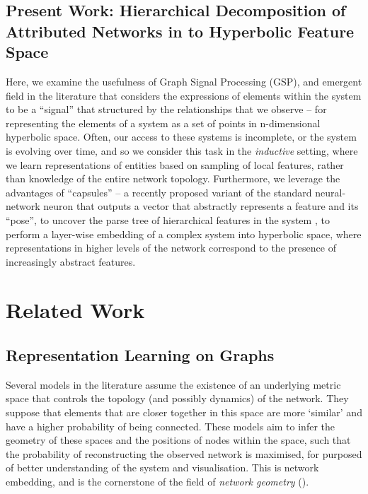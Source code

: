 \documentclass{IEEEtran}
\begin{document}
	
	\subsection{Present Work: Hierarchical Decomposition of Attributed Networks in to Hyperbolic Feature Space}
	Here, we examine the usefulness of Graph Signal Processing (GSP), and emergent field in the literature that considers the expressions of elements within the system to be a ``signal'' that structured by the relationships that we observe \cite{defferrard2016convolutional,kipf2016semi,hamilton2017inductive} -- for representing the elements of a system as a set of points in n-dimensional hyperbolic space.
	Often, our access to these systems is incomplete, or the system is evolving over time, and so we consider this task in the \textit{inductive} setting, where we learn representations of entities based on sampling of local features, rather than knowledge of the entire network topology.
	Furthermore, we leverage the advantages of ``capsules'' -- a recently proposed variant of the standard neural-network neuron that outputs a vector that abstractly represents a feature and its ``pose'', to uncover the parse tree of hierarchical features in the system \cite{hinton2011transforming,sabour2017dynamic}, to perform a layer-wise embedding of a complex system into hyperbolic space, where representations in higher levels of the network correspond to the presence of increasingly abstract features.
	

	
	
	
	\section{Related Work}
	
		
	\subsection{Representation Learning on Graphs}
	Several models in the literature assume the existence of an underlying metric space that controls the topology (and possibly dynamics) of the network. 
	They suppose that elements that are closer together in this space are more `similar' and have a higher probability of being connected. These models aim to infer the geometry of these spaces and the positions of nodes within the space, such that the probability of reconstructing the observed network is maximised, for purposed of better understanding of the system and visualisation. 
	This is network embedding, and is the cornerstone of the field of \textit{network geometry} (\cite{krioukov2010hyperbolic}). 
	
\end{document}
